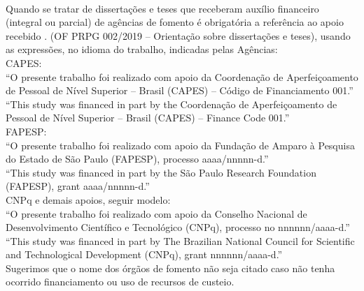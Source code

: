 \begin{agradecimentos}

\color{red}{Elemento opcional no qual o autor faz agradecimentos dirigidos àqueles que contribuíram de maneira relevante à elaboração do trabalho.}\\


Quando se tratar de dissertações e teses que receberam auxílio financeiro (integral ou parcial) de agências de fomento é obrigatória a referência ao apoio recebido . (OF PRPG 002/2019 – Orientação sobre dissertações e teses), usando as expressões, no idioma do trabalho, indicadas pelas Agências:\\

CAPES:\\
“O presente trabalho foi realizado com apoio da Coordenação de Aperfeiçoamento de Pessoal de Nível Superior – Brasil (CAPES) – Código de Financiamento 001.”\\
“This study was financed in part by the Coordenação de Aperfeiçoamento de Pessoal de Nível Superior – Brasil (CAPES) – Finance Code 001.”\\

FAPESP:\\
“O presente trabalho foi realizado com apoio da Fundação de Amparo à Pesquisa do Estado de São Paulo (FAPESP), processo aaaa/nnnnn-d.”\\
“This study was financed in part by the São Paulo Research Foundation (FAPESP), grant aaaa/nnnnn-d.”\\

CNPq e demais apoios, seguir modelo:\\
“O presente trabalho foi realizado com apoio da Conselho Nacional de Desenvolvimento Científico e Tecnológico (CNPq), processo no nnnnnn/aaaa-d.”\\
“This study was financed in part by The Brazilian National Council for Scientific and Technological Development (CNPq), grant nnnnnn/aaaa-d.”\\


Sugerimos que o nome dos órgãos de fomento não seja citado caso não tenha ocorrido financiamento ou uso de recursos de custeio.


\end{agradecimentos}
